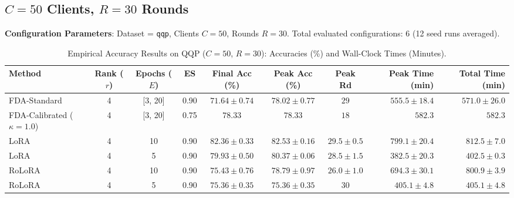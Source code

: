 \documentclass[10pt,a4paper]{article}
\begin{document}
\clearpage
\subsection{\texorpdfstring{$C=50$ Clients, $R=30$ Rounds}{C=50 Clients, R=30 Rounds}}

\textbf{Configuration Parameters}: Dataset = \texttt{qqp}, Clients $C = 50$, Rounds $R = 30$. Total evaluated configurations: 6 (12 seed runs averaged).

\begin{table}[H]
\centering
\caption{Empirical Accuracy Results on QQP ($C=50$, $R=30$): Accuracies (\%) and Wall-Clock Times (Minutes).}
\scriptsize
\setlength{\tabcolsep}{3.5pt}
\begin{tabular*}{\textwidth}{@{\extracolsep{\fill}}lccccccrr@{}}
\toprule
\textbf{Method} & \textbf{Rank ($r$)} & \textbf{Epochs ($E$)} & \textbf{ES} & \textbf{Final Acc (\%)} & \textbf{Peak Acc (\%)} & \textbf{Peak Rd} & \textbf{Peak Time (min)} & \textbf{Total Time (min)} \\
\midrule
FDA-Standard & 4 & [3, 20] & 0.90 & $71.64 \pm 0.74$ & $78.02 \pm 0.77$ & $29$ & $555.5 \pm 18.4$ & $571.0 \pm 26.0$ \\
FDA-Calibrated ($\kappa=1.0$) & 4 & [3, 20] & 0.75 & $78.33$ & $78.33$ & $18$ & $582.3$ & $582.3$ \\
LoRA & 4 & 10 & 0.90 & $\mathbf{82.36 \pm 0.33}$ & $\mathbf{82.53 \pm 0.16}$ & $29.5 \pm 0.5$ & $799.1 \pm 20.4$ & $812.5 \pm 7.0$ \\
LoRA & 4 & 5 & 0.90 & $79.93 \pm 0.50$ & $80.37 \pm 0.06$ & $28.5 \pm 1.5$ & $\mathbf{382.5 \pm 20.3}$ & $402.5 \pm 0.3$ \\
RoLoRA & 4 & 10 & 0.90 & $75.43 \pm 0.76$ & $78.79 \pm 0.97$ & $26.0 \pm 1.0$ & $694.3 \pm 30.1$ & $800.9 \pm 3.9$ \\
RoLoRA & 4 & 5 & 0.90 & $75.36 \pm 0.35$ & $75.36 \pm 0.35$ & $30$ & $405.1 \pm 4.8$ & $405.1 \pm 4.8$ \\
\bottomrule
\end{tabular*}
\end{table}
\end{document}
